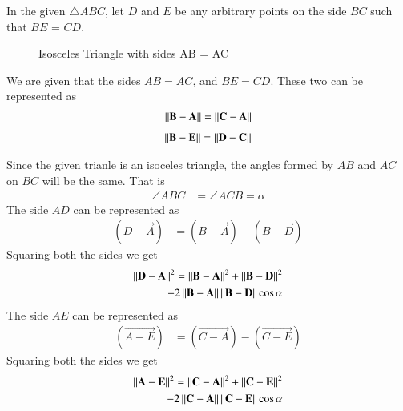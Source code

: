 	
	In the given  $\triangle ABC$, let $D$ and $E$ be any arbitrary points on the side $BC$ such that $BE$ = $CD$.
	
	\begin{figure}[!ht] \label{eq:solutions/1/17/fig:two_triangles}
		\centering
		\resizebox{\columnwidth}{!}{}
		\caption{Isosceles Triangle with sides AB = AC}
	\end{figure}
	We are given that the sides $AB = AC$, and $BE = CD$. These two can be represented as
	\begin{align}\label{eq:solutions/1/17/eq:fact1}
		\left\lVert\mathbf{B}-\mathbf{A}\right\rVert = \left\lVert\mathbf{C}-\mathbf{A}\right\rVert
	\end{align}
	\begin{align}\label{eq:solutions/1/17/eq:fact2}
		\left\lVert\mathbf{B}-\mathbf{E}\right\rVert = \left\lVert\mathbf{D}-\mathbf{C}\right\rVert
	\end{align}
	
	Since the given trianle is an isoceles triangle, the angles formed by $AB$ and $AC$ on $BC$ will be the same. That is
	\begin{align}\label{eq:solutions/1/17/eq:fact3}
		\angle ABC &= \angle ACB = \alpha
	\end{align}
	The side $AD$ can be represented as 
	\begin{align}\label{eq:solutions/1/17/eq:eq1}
		(\vec{D-A}) &= (\vec{B-A}) - (\vec{B-D})
	\end{align}
	Squaring both the sides we get	
	\begin{align} \label{eq:solutions/1/17/eq:eq2}
		\left\lVert\mathbf{D}-\mathbf{A}\right\rVert^{2} = \left\lVert\mathbf{B}-\mathbf{A}\right\rVert^{2} + \left\lVert\mathbf{B}-\mathbf{D}\right\rVert^{2} \nonumber \\ - 2\left\lVert\mathbf{B}-\mathbf{A}\right\rVert\left\lVert\mathbf{B}-\mathbf{D}\right\rVert\cos\alpha
	\end{align}
	The side $AE$ can be represented as 
	\begin{align}\label{eq:solutions/1/17/eq:eq3}
		(\vec{A-E}) &= (\vec{C-A}) - (\vec{C-E})
	\end{align}
	Squaring both the sides we get	
	\begin{align} \label{eq:solutions/1/17/eq:eq4}
		\left\lVert\mathbf{A}-\mathbf{E}\right\rVert^{2} = \left\lVert\mathbf{C}-\mathbf{A}\right\rVert^{2} + \left\lVert\mathbf{C}-\mathbf{E}\right\rVert^{2} \nonumber \\  - 2\left\lVert\mathbf{C}-\mathbf{A}\right\rVert\left\lVert\mathbf{C}-\mathbf{E}\right\rVert\cos\alpha
	\end{align}
	
